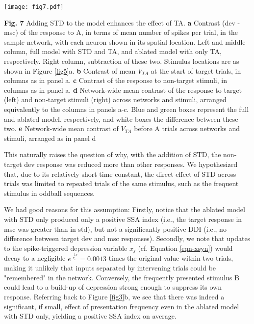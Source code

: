 \documentclass[pdflatex,referee,iicol,sn-basic]{sn-jnl}
\theoremstyle{thmstyleone}%
\theoremstyle{thmstyletwo}%
\theoremstyle{thmstylethree}%
\begin{document}
\begin{figure*}%
    \centering
    \texttt{[image: fig7.pdf]}
    \caption{}
    \label{fig7}
\end{figure*}
\textbf{Fig. 7} Adding STD to the model enhances the effect of TA.
\textbf{a} Contrast (dev - msc) of the response to A, in terms of mean number of spikes per trial, in the sample network, with each neuron shown in its spatial location. Left and middle column, full model with STD and TA, and ablated model with only TA, respectively. Right column, subtraction of these two. Stimulus locations are as shown in Figure \ref{fig5}a.
\textbf{b} Contrast of mean $V_{TA}$ at the start of target trials, in columns as in panel a.
\textbf{c} Contrast of the response to non-target stimuli, in columns as in panel a.
\textbf{d} Network-wide mean contrast of the response to target (left) and non-target stimuli (right) across networks and stimuli, arranged equivalently to the columns in panels a-c. Blue and green boxes represent the full and ablated model, respectively, and white boxes the difference between these two.
\textbf{e} Network-wide mean contrast of $V_{TA}$ before A trials across networks and stimuli, arranged as in panel d

This naturally raises the question of why, with the addition of STD, the non-target dev response was reduced more than other responses. We hypothesized that, due to its relatively short time constant, the direct effect of STD across trials was limited to repeated trials of the same stimulus, such as the frequent stimulus in oddball sequences.

We had good reasons for this assumption: Firstly, notice that the ablated model with STD only produced only a positive SSA index (i.e., the target response in msc was greater than in std), but not a significantly positive DDI (i.e., no difference between target dev and msc responses). Secondly, we note that updates to the spike-triggered depression variable $x_j$ (cf. Equation \ref{eqn-xsyn}) would decay to a negligible $e^\frac{-1 s}{\tau_x} = 0.0013$ times the original value within two trials, making it unlikely that inputs separated by intervening trials could be "remembered" in the network. Conversely, the frequently presented stimulus B could lead to a build-up of depression strong enough to suppress its own response. Referring back to Figure \ref{fig3}b, we see that there was indeed a significant, if small, effect of presentation frequency even in the ablated model with STD only, yielding a positive SSA index on average.
\end{document}
